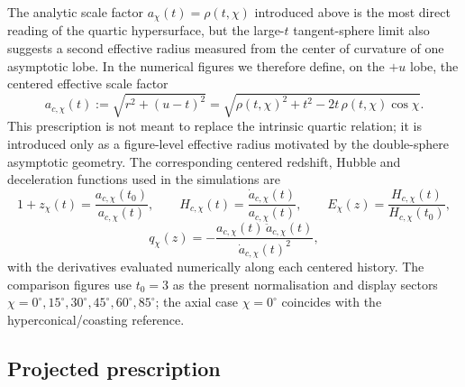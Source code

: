 \documentclass[preprint,12pt]{elsarticle}
\begin{document}
The analytic scale factor $a_\chi(t)=\rho(t,\chi)$ introduced above is the most direct reading of the quartic hypersurface, but the large-$t$ tangent-sphere limit also suggests a second effective radius measured from the center of curvature of one asymptotic lobe. In the numerical figures we therefore define, on the $+u$ lobe, the centered effective scale factor
\begin{equation}
a_{c,\chi}(t):=\sqrt{r^2+(u-t)^2}
=\sqrt{\rho(t,\chi)^2+t^2-2t\,\rho(t,\chi)\cos\chi}.
\end{equation}
This prescription is not meant to replace the intrinsic quartic relation; it is introduced only as a figure-level effective radius motivated by the double-sphere asymptotic geometry. The corresponding centered redshift, Hubble and deceleration functions used in the simulations are
\begin{equation}
1+z_\chi(t)=\frac{a_{c,\chi}(t_0)}{a_{c,\chi}(t)},\qquad
H_{c,\chi}(t)=\frac{\dot a_{c,\chi}(t)}{a_{c,\chi}(t)},\qquad
E_\chi(z)=\frac{H_{c,\chi}(t)}{H_{c,\chi}(t_0)},
\end{equation}
\begin{equation}
q_\chi(z)=-\frac{a_{c,\chi}(t)\,\ddot a_{c,\chi}(t)}{\dot a_{c,\chi}(t)^2},
\end{equation}
with the derivatives evaluated numerically along each centered history. The comparison figures use $t_0=3$ as the present normalisation and display sectors $\chi=0^\circ,15^\circ,30^\circ,45^\circ,60^\circ,85^\circ$; the axial case $\chi=0^\circ$ coincides with the hyperconical/coasting reference.

\subsection{Projected prescription}
\end{document}
